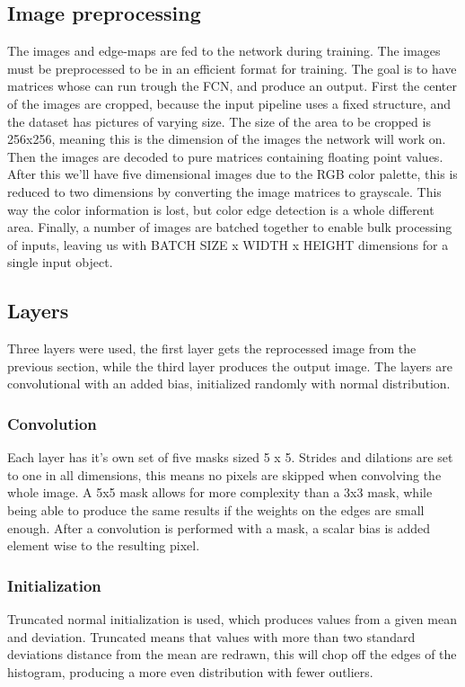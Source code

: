 \documentclass[12pt]{report}
\begin{document}
\subsection{Image preprocessing}
The images and edge-maps are fed to the network during training. The images must be preprocessed to be in an efficient format for training. The goal is to have matrices whose can run trough the FCN, and produce an output. First the center of the images are cropped, because the input pipeline uses a fixed structure, and the dataset has pictures of varying size. The size of the area to be cropped is 256x256, meaning this is the dimension of the images the network will work on. Then the images are decoded to pure matrices containing floating point values. After this we'll have five dimensional images due to the RGB color palette, this is reduced to two dimensions by converting the image matrices to grayscale. This way the color information is lost, but color edge detection is a whole different area. Finally, a number of images are batched together to enable bulk processing of inputs, leaving us with BATCH SIZE x WIDTH x HEIGHT dimensions for a single input object.
\subsection{Layers}
Three layers were used, the first layer gets the reprocessed image from the previous section, while the third layer produces the output image. The layers are convolutional with an added bias, initialized randomly with normal distribution.\par
\subsubsection{Convolution}
Each layer has it's own set of five masks sized 5 x 5. Strides and dilations are set to one in all dimensions, this means no pixels are skipped when convolving the whole image. A 5x5 mask allows for more complexity than a 3x3 mask, while being able to produce the same results if the weights on the edges are small enough. After a convolution is performed with a mask, a scalar bias is added element wise to the resulting pixel.
\subsubsection{Initialization}
Truncated normal initialization is used, which produces values from a given mean and deviation. Truncated means that values with more than two standard deviations distance from the mean are redrawn, this will chop off the edges of the histogram, producing a more even distribution with fewer outliers.
\end{document}
